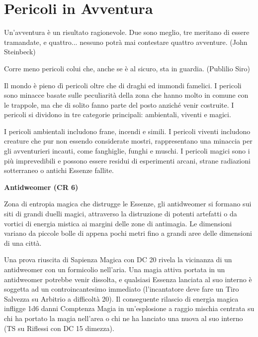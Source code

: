 \documentclass[a4paper,11pt,twoside,openany]{book}
\begin{document}
\pagebreak

\section{Pericoli in Avventura}


\begin{tcolorbox}[enhanced,arc=5pt,boxrule=0.3pt]{Un'avventura è un risultato ragionevole. Due sono meglio, tre meritano di essere tramandate, e quattro... nessuno potrà mai contestare quattro avventure. (John Steinbeck)}\end{tcolorbox}\medskip


\label{pericoli-in-avventura}
\begin{tcolorbox}[enhanced,arc=5pt,boxrule=0.3pt]{Corre meno pericoli colui che, anche se è al sicuro, sta in guardia. (Publilio Siro)}\end{tcolorbox}\medskip
Il mondo è pieno dì pericoli oltre che di draghi ed immondi famelici. I pericoli sono minacce basate sulle peculiarità della zona che hanno molto in comune con le trappole, ma che di solito fanno parte del posto anziché venir costruite. I pericoli si dividono in tre categorie principali: ambientali, viventi e magici.

I pericoli ambientali includono frane, incendi e simili. I pericoli viventi includono creature che pur non essendo considerate mostri, rappresentano una minaccia per gli av­venturieri incauti, come fanghiglie, funghi e muschi. I pericoli magici sono i più imprevedibili e possono essere residui di esperimenti arcani, strane radiazioni sotterraneo o antichi Essenze fallite.

\textbf{Antidweomer (CR 6)}

Zona di entropia magica che distrugge le Essenze, gli antidweomer si formano sui siti di grandi duelli magici, attraverso la distruzione di potenti artefatti o da vortici di energia mistica ai margini delle zone di antimagia. Le dimensioni variano da piccole bolle di appena pochi metri fino a grandi aree delle dimensioni di una città.

Una prova riuscita di Sapienza Magica con DC 20 rivela la vicinanza di un antidweomer con un formicolio nell'aria. Una magia attiva portata in un antidweomer potrebbe venir dissolta, e qualsiasi Essenza lanciata al suo interno è soggetta ad un controincantesimo immediato (l'incantatore deve fare un Tiro Salvezza su Arbitrio a difficoltà 20). Il conseguente rilascio di energia magica infligge 1d6 danni Comptenza Magia in un'esplosione a raggio mischia centrata su chi ha portato la magia nell'area o chi ne ha lanciato una nuova al suo interno (TS su Riflessi con DC 15 dimezza).
\end{document}
